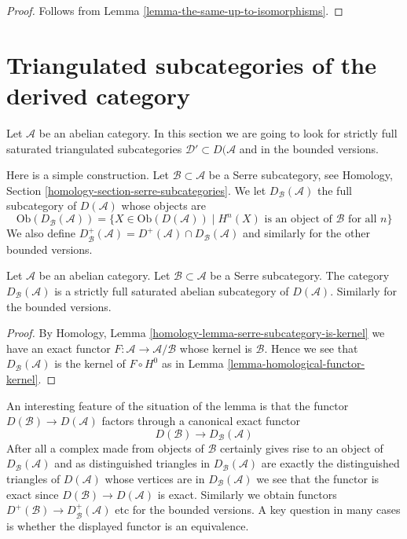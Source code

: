 \begin{proof}
Follows from
Lemma \ref{lemma-the-same-up-to-isomorphisms}.
\end{proof}







\section{Triangulated subcategories of the derived category}
\label{section-triangulated-sub}

\noindent
Let $\mathcal{A}$ be an abelian category. In this section we are
going to look for strictly full saturated triangulated subcategories
$\mathcal{D}' \subset D(\mathcal{A}$ and in the bounded versions.

\medskip\noindent
Here is a simple construction. Let $\mathcal{B} \subset \mathcal{A}$
be a Serre subcategory, see
Homology, Section \ref{homology-section-serre-subcategories}.
We let $D_\mathcal{B}(\mathcal{A})$ the full subcategory of
$D(\mathcal{A})$ whose objects are
$$
\text{Ob}(D_\mathcal{B}(\mathcal{A}))
=
\{X \in \text{Ob}(D(\mathcal{A})) \mid
H^n(X) \text{ is an object of }\mathcal{B}\text{ for all }n\}
$$
We also define
$D^{+}_\mathcal{B}(\mathcal{A}) =
D^{+}(\mathcal{A}) \cap D_\mathcal{B}(\mathcal{A})$
and similarly for the other bounded versions.

\begin{lemma}
\label{lemma-cohomology-in-serre-subcategory}
Let $\mathcal{A}$ be an abelian category.
Let $\mathcal{B} \subset \mathcal{A}$ be a Serre subcategory.
The category $D_\mathcal{B}(\mathcal{A})$ is a strictly full
saturated abelian subcategory of $D(\mathcal{A})$.
Similarly for the bounded versions.
\end{lemma}

\begin{proof}
By
Homology, Lemma \ref{homology-lemma-serre-subcategory-is-kernel}
we have an exact functor $F : \mathcal{A} \to \mathcal{A}/\mathcal{B}$
whose kernel is $\mathcal{B}$. Hence we see that
$D_\mathcal{B}(\mathcal{A})$ is the kernel of $F \circ H^0$ as in
Lemma \ref{lemma-homological-functor-kernel}.
\end{proof}

\noindent
An interesting feature of the situation of the lemma is that the
functor $D(\mathcal{B}) \to D(\mathcal{A})$ factors through a canonical
exact functor
\begin{equation}
\label{equation-compare}
D(\mathcal{B}) \longrightarrow D_\mathcal{B}(\mathcal{A})
\end{equation}
After all a complex made from objects of $\mathcal{B}$ certainly
gives rise to an object of $D_\mathcal{B}(\mathcal{A})$ and as
distinguished triangles in $D_\mathcal{B}(\mathcal{A})$ are exactly the
distinguished triangles of $D(\mathcal{A})$ whose vertices are in
$D_\mathcal{B}(\mathcal{A})$ we see that the functor is exact since
$D(\mathcal{B}) \to D(\mathcal{A})$ is exact. Similarly we obtain functors
$D^+(\mathcal{B}) \longrightarrow D^+_\mathcal{B}(\mathcal{A})$ etc
for the bounded versions. A key question in many cases is whether the
displayed functor is an equivalence.

